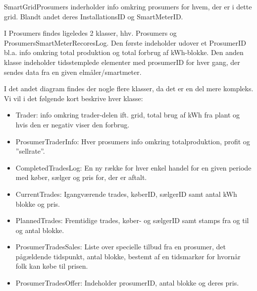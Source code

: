 SmartGridProsumers inderholder info omkring prosumers for hvem, der er i dette grid. Blandt andet deres InstallationsID og SmartMeterID.

I Prosumers findes ligeledes 2 klasser, hhv. Prosumers og ProsumersSmartMeterRecoresLog.
Den første indeholder udover et ProsumerID bl.a. info omkring total produktion og total forbrug af kWh-blokke. Den anden klasse indeholder tidsstemplede elementer med prosumerID for hver gang, der sendes data fra en given elmåler/smartmeter.


I det andet diagram findes der nogle flere klasser, da det er en del mere kompleks. Vi vil i det følgende kort beskrive hver klasse:
\begin{itemize}

\item Trader: info omkring trader-delen ift. grid, total brug af kWh fra plant og hvis den er negativ viser den forbrug.
\item ProsumerTraderInfo: Hver prosumers info omkring totalproduktion, profit og ”sellrate”.
\item CompletedTradesLog: En ny række for hver enkel handel for en given periode med køber, sælger og pris for, der er aftalt.
\item CurrentTrades: Igangværende trades, køberID, sælgerID samt antal kWh blokke og pris.
\item PlannedTrades: Fremtidige trades, køber- og sælgerID samt stamps fra og til og antal blokke.
\item ProsumerTradesSales: Liste over specielle tilbud fra en prosumer, det pågældende tidspunkt, antal blokke, bestemt af en tidsmarkør for hvornår folk kan købe til prisen. 
\item ProsumerTradesOffer: Indeholder prosumerID, antal blokke og deres pris.
\end{itemize}




    

